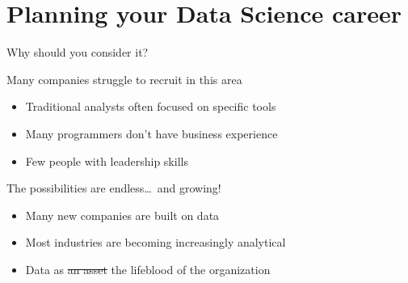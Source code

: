 \section[Planning your \\ Data Science career]%
        {Planning your Data Science career}

\begin{frame}{Why should you consider it?}
    \vspace{1em}
    \begin{block}{Many companies struggle to recruit in this area}
        \begin{itemize}
            \item Traditional analysts often focused on specific tools
            \item Many programmers don't have business experience
            \item Few people with leadership skills
        \end{itemize}
    \end{block}
    \vfill
    \begin{block}{The possibilities are endless\ldots~and growing!}
        \begin{itemize}
            \item Many new companies are built on data
            \item Most industries are becoming increasingly analytical
            \item Data as \sout{an asset} the lifeblood of the organization
        \end{itemize}
    \end{block}
\end{frame}

